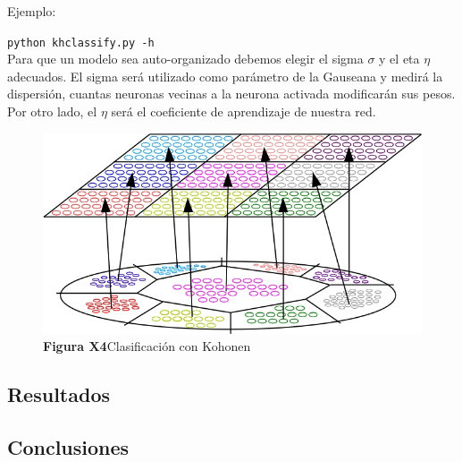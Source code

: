 Ejemplo:

\noindent\texttt{python khclassify.py -h} \\


Para que un modelo sea auto-organizado debemos elegir el sigma $\sigma$ y  el eta $\eta$ adecuados. El sigma será 
utilizado como parámetro de la Gauseana y medirá la dispersión, cuantas neuronas vecinas a la neurona activada modificarán 
sus pesos. Por otro lado, el $\eta$ será el coeficiente de aprendizaje de nuestra red.

\begin{figure}[ht!]
	\centering
	\includegraphics[width=0.8\linewidth]{img/parte2-kohonen9clases.jpg}
	\caption{\textbf{Figura X4}Clasificación con Kohonen}
\end{figure}


\subsection{Resultados}


\subsection{Conclusiones}

